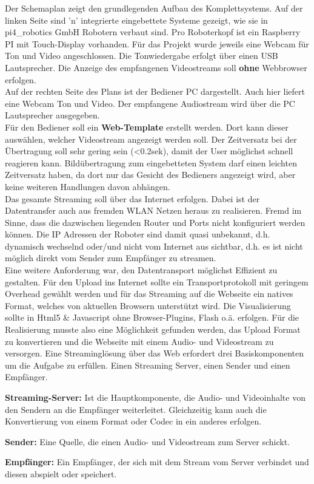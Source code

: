 Der Schemaplan zeigt den grundlegenden Aufbau des Komplettsystems. Auf der linken Seite sind 'n' integrierte eingebettete Systeme gezeigt, wie sie in pi4\_robotics GmbH Robotern verbaut sind. Pro Roboterkopf ist ein Raspberry PI mit Touch-Display vorhanden. Für das Projekt wurde jeweils eine Webcam für Ton und Video angeschlossen. Die Tonwiedergabe erfolgt über einen USB Lautsprecher. Die Anzeige des empfangenen Videostreams soll \textbf{ohne} Webbrowser erfolgen.\\
Auf der rechten Seite des Plans ist der Bediener PC dargestellt. Auch hier liefert eine Webcam Ton und Video. Der empfangene Audiostream wird über die PC Lautsprecher ausgegeben.\\
Für den Bediener soll ein \textbf{Web-Template} erstellt werden. Dort kann dieser auswählen, welcher Videostream angezeigt werden soll. Der Zeitversatz bei der Übertragung soll sehr gering sein 
(<0.2sek), damit der User möglichst schnell reagieren kann. Bildübertragung zum eingebetteten System darf einen leichten Zeitversatz haben, da dort nur das Gesicht des Bedieners angezeigt wird, aber keine weiteren Handlungen davon abhängen.\\
Das gesamte Streaming soll über das Internet erfolgen. Dabei ist der Datentransfer auch aus 
fremden WLAN Netzen heraus zu realisieren. Fremd im Sinne, dass die dazwischen liegenden Router und Ports nicht konfiguriert werden können. Die IP Adressen der Roboter sind damit quasi unbekannt, d.h. dynamisch wechselnd oder/und nicht vom Internet aus sichtbar, d.h. es ist nicht möglich direkt vom Sender zum Empfänger zu streamen.\\
Eine weitere Anforderung war, den Datentransport möglichst Effizient zu gestalten. Für den Upload ins Internet sollte ein Transportprotokoll mit geringem Overhead gewählt werden und für das Streaming auf die Webseite ein natives Format, welches von aktuellen Browsern unterstützt wird. Die Visualisierung sollte in Html5 \& Javascript ohne Browser-Plugins, Flash o.ä. erfolgen. Für die Realisierung musste also eine Möglichkeit gefunden werden, das Upload Format zu konvertieren und die Webseite mit einem Audio- und Videostream zu versorgen. Eine Streaminglösung über das Web erfordert drei Basiskomponenten um die Aufgabe zu erfüllen. Einen Streaming Server, einen Sender und einen Empfänger.

\textbf{Streaming-Server:} 
Ist die Hauptkomponente, die Audio- und Videoinhalte von den Sendern an die Empfänger weiterleitet. Gleichzeitig kann auch die Konvertierung von einem Format oder Codec in ein anderes erfolgen.

\textbf{Sender:} Eine Quelle, die einen Audio- und Videostream zum Server schickt. 

\textbf{Empfänger:} Ein Empfänger, der sich mit dem Stream vom Server verbindet und diesen abspielt oder speichert.